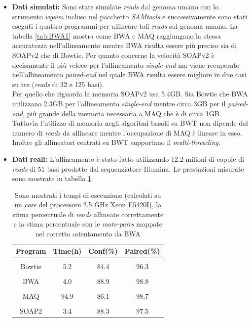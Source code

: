 \documentclass[conference]{IEEEtran}
\begin{document}
\begin{itemize}
	\item \textbf{Dati simulati:} 
Sono state simulate \textit{reads} dal genoma umano con lo strumento \textit{wgsim} incluso nel pacchetto \textit{SAMtools} e successivamente sono stati eseguti i quattro programmi per allineare tali \textit{reads} sul genoma umano. La tabella \ref{tab:BWA1} mostra come BWA e MAQ raggiungano la stessa accuratezza nell'allineamento mentre BWA risulta essere più preciso sia di SOAPv2 che di Bowtie. Per quanto concerne la velocità SOAPv2 è decisamente il più veloce per l'allineamento \textit{single-end} ma viene recuperato nell'allineamento \textit{paired-end} nel quale BWA risulta essere migliore in due casi su tre (\textit{reads} di 32 e 125 basi).\\
Per quello che riguarda la memoria SOAPv2 usa 5.4GB. Sia Bowtie che BWA utilizzano 2.3GB per l'allineamento \textit{single-end} mentre circa 3GB per il \textit{paired-end}, più grande della memoria necessaria a MAQ che è di circa 1GB. Tuttavia l'utilizzo di memoria negli algoritmi basati su BWT non dipende dal numero di \textit{reads} da allineare mentre l'occupazione di MAQ è lineare in esso. Inoltre gli allineatori centrati su BWT supportano il \textit{multi-threading}.\\
	\item \textbf{Dati reali:}
	L'allineamento è stato fatto utilizzando 12.2 milioni di coppie di \textit{reads} di 51 basi prodotte dal sequenziatore Illumina. Le prestazioni misurate sono mostrate in tabella \ref{tab:BWA2}.

\begin{table}
\begin{center}
\begin{tabular}{c c c c}
Program & Time(h) & Conf(\%) & Paired(\%) \\
\hline{}
&&&\\
Bowtie & 5.2 & 84.4 & 96.3 \\
&&&\\
BWA & 4.0 & 88.9 & 98.8 \\
&&&\\
MAQ & 94.9 & 86.1 & 98.7 \\
&&&\\
SOAP2 & 3.4 & 88.3 & 97.5 \\
\end{tabular}
\end{center}
\caption{Sono mostrati i tempi di esecuzione (calcolati su un \textit{core} del processore 2.5 GHz Xeon E5420I), la stima percentuale di \textit{reads} allineate correttamente e la stima percentuale con le \textit{mate-pairs} mappate nel corretto orientamento da BWA}
\label{tab:BWA2}
\end{table}

\end{itemize}
		
\end{document}
